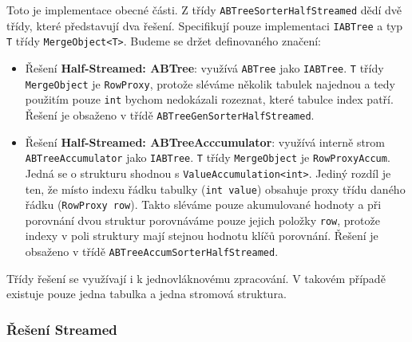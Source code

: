 Toto je implementace obecné části.
Z třídy \texttt{ABTreeSorterHalfStreamed} dědí dvě třídy, které představují dva řešení.
Specifikují pouze implementaci \texttt{IABTree} a typ \texttt{T} třídy \texttt{MergeObject<T>}.
Budeme se držet definovaného značení:
\begin{itemize}
\item Řešení \textbf{Half-Streamed: ABTree}: využívá \texttt{ABTree} jako \texttt{IABTree}.
\texttt{T} třídy \texttt{MergeObject} je \texttt{RowProxy}, protože sléváme několik tabulek najednou a tedy použitím pouze \texttt{int} bychom nedokázali rozeznat, které tabulce index patří.
Řešení je obsaženo v třídě \texttt{ABTreeGenSorterHalfStreamed}.

\item Řešení \textbf{Half-Streamed: ABTreeAcccumulator}: využívá interně strom \texttt{ABTreeAccumulator} jako \texttt{IABTree}.
\texttt{T} třídy \texttt{MergeObject} je \texttt{RowProxyAccum}.
Jedná se o strukturu shodnou s \texttt{ValueAccumulation<int>}. 
Jediný rozdíl je ten, že místo indexu řádku tabulky (\texttt{int value}) obsahuje proxy třídu daného řádku (\texttt{RowProxy row}).
Takto sléváme pouze akumulované hodnoty a při porovnání dvou struktur porovnáváme pouze jejich položky \texttt{row}, protože indexy v poli struktury mají stejnou hodnotu klíčů porovnání.
Řešení je obsaženo v třídě \texttt{ABTreeAccumSorterHalfStreamed}.

\end{itemize}
Třídy řešení se využívají i k jednovláknovému zpracování.
V takovém případě existuje pouze jedna tabulka a jedna stromová struktura.

\subsubsection{Řešení Streamed}

